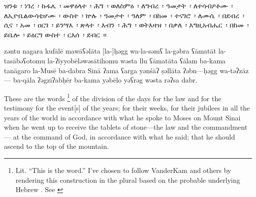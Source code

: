 
\begin{ethiopictext}
        ዝንቱ~፡ ነገረ~፡ ኩፋሌ~፡
        መዋዕላተ~፡ ሕግ~፡ ወለስምዕ~፡
        ለግብረ~፡ ዓመታት~፡ ለተሳብዖቶሙ~፡ 
        ለኢዮቤልውሳቲሆሙ~፡ ውስተ~፡ ኵሉ~፡ ዓመታተ~፡ ዓለም~፡
        በከመ~፡ ተናገሮ~፡ ለሙሴ~፡ በደብረ~፡ ሲና~፡
        አመ~፡ ዐርገ~፡ ይንሣእ~፡ ጽላተ~፡ እብን~፡ ሕግ~፡ ወትእዛዝ~፡ 
        በቃለ~፡ እግዚአብሔር~፡ በከመ~፡ ይቤሎ~፡ ይዕርግ ውስተ~፡ ርእሰ~፡ ደብር~።
\end{ethiopictext}

\begin{transliteration}
        zəntu nagara kufālē
        mawāʕəlāta [la-]ḥəgg wa-la-səmʕ
        la-gəbra ʕāmatāt la-tasābəʕotomu
        la-ʔiyyobēləwəsātihomu wəsta llu ʕāmatāta ʕālam
        ba-kama tanāgaro la-Musē ba-dabra Sinā
        ʔama ʕarga yənśāʔ ṣəllāta ʔəbn---ḥəgg wa-təʔzāz---%
        ba-qāla ʔəgziʔabḥēr ba-kama yəbēlo yəʕrəg wəsta rəʔsa dabr.
\end{transliteration}

\begin{translation}
        These are the words%
        \footnote{Lit. ``This is the word.'' I've chosen to follow VanderKam and others by rendering this construction in the plural based on the probable underlying Hebrew . See \cite[125]{vanderkam2018}}
        of the division 
        of the days for the law and for the testimony
        for the event[s] of the years; for their weeks,
        for their jubilees in all the years of the world
        in accordance with what he spoke to Moses on Mount Sinai 
        when he went up to receive the tablets of stone---the law and the commandment---%
        at the command of God, in accordance with what he said;
        that he should ascend to the top of the mountain.
\end{translation}
